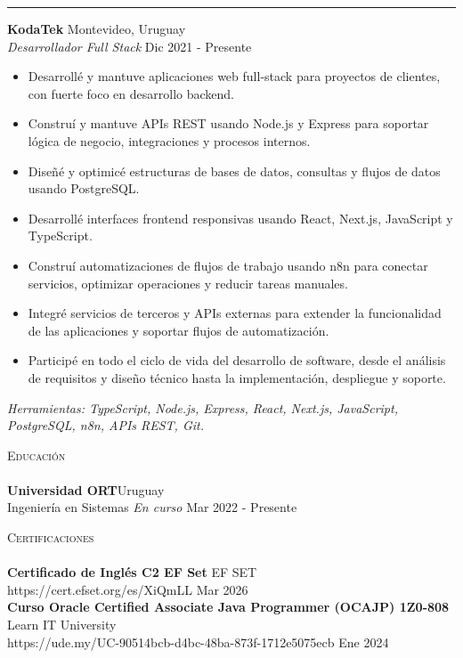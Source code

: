 \documentclass[11pt,a4paper]{article}
\newcommand{\lineunder} {
    \vspace*{-8pt} \\
    \hspace*{-18pt} \hrulefill \\
}
\newcommand{\header} [1] {
    {\hspace*{-18pt}\vspace*{6pt} \textsc{#1}}
    \vspace*{-6pt} \lineunder
}
\begin{document}
\vspace{1.5mm}
\hrule
\vspace{1.5mm}

\textbf{KodaTek} \hfill Montevideo, Uruguay\\
\textit{Desarrollador Full Stack} \hfill Dic 2021 - Presente\\
\vspace{-1mm}
\begin{itemize} \itemsep -1pt
	\item Desarrollé y mantuve aplicaciones web full-stack para proyectos de clientes, con fuerte foco en desarrollo backend.
	\item Construí y mantuve APIs REST usando Node.js y Express para soportar lógica de negocio, integraciones y procesos internos.
	\item Diseñé y optimicé estructuras de bases de datos, consultas y flujos de datos usando PostgreSQL.
	\item Desarrollé interfaces frontend responsivas usando React, Next.js, JavaScript y TypeScript.
	\item Construí automatizaciones de flujos de trabajo usando n8n para conectar servicios, optimizar operaciones y reducir tareas manuales.
	\item Integré servicios de terceros y APIs externas para extender la funcionalidad de las aplicaciones y soportar flujos de automatización.
	\item Participé en todo el ciclo de vida del desarrollo de software, desde el análisis de requisitos y diseño técnico hasta la implementación, despliegue y soporte.
\end{itemize}
\vspace{-1mm}
\textit{Herramientas: TypeScript, Node.js, Express, React, Next.js, JavaScript, PostgreSQL, n8n, APIs REST, Git.}
\vspace{1.5mm}

\header{Educación}
\textbf{Universidad ORT}\hfill Uruguay\\
Ingeniería en Sistemas \textit{En curso} \hfill Mar 2022 - Presente\\
\vspace{1.5mm}





\header{Certificaciones}
\textbf{Certificado de Inglés C2 EF Set} \hfill EF SET\\
https://cert.efset.org/es/XiQmLL \hfill Mar 2026\\
\vspace*{1mm}
\textbf{Curso Oracle Certified Associate Java Programmer (OCAJP) 1Z0-808} \hfill Learn IT University\\
https://ude.my/UC-90514bcb-d4bc-48ba-873f-1712e5075ecb \hfill Ene 2024\\
\vspace*{1mm}

\ 
\end{document}
